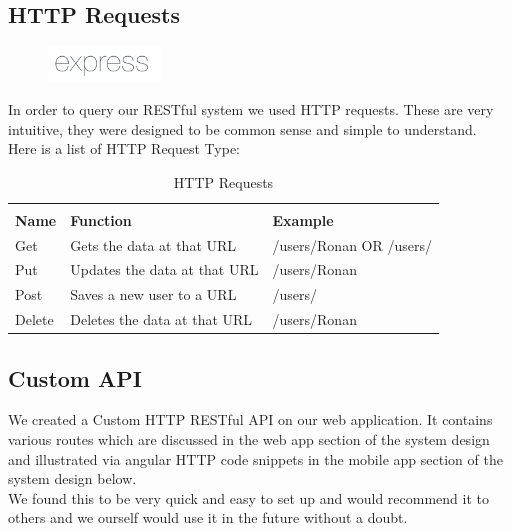   \subsection{HTTP Requests}
  \begin{figure}
  	\includegraphics[width=3cm]{img/mobile-app/logos/express.png}
  \end{figure} 
  \cite{http_methods}
  In order to query our RESTful system we used HTTP requests.
  These are very intuitive, they were designed to be common sense and simple to understand.
  \\
  Here is a list of HTTP Request Type:
	    \begin{table}[H]
	    	\centering
	    	\begin{tabular}{x{2cm}p{6cm}p{6cm}}
	    		\toprule \\
	    		\textbf{Name} & \textbf{Function} & \textbf{Example} \\ \hline
	    		Get & Gets the data at that URL & /users/Ronan OR /users/ \\ \hline
	    		Put & Updates the data at that URL & /users/Ronan \\ \hline
	    		Post & Saves a new user to a URL & /users/ \\ \hline
	    		Delete & Deletes the data at that URL & /users/Ronan \\ \hline    			    	    		
	    		\bottomrule
	    	\end{tabular}
	    	\caption{HTTP Requests}
	    	\label{table:HttpRequests}
	    \end{table}
    
  \subsection{Custom API}
We created a Custom HTTP RESTful API on our web application.
It contains various routes which are discussed in the web app section of the system design and illustrated via angular HTTP code snippets in the mobile app section of the system design below.
\\

We found this to be very quick and easy to set up and would recommend it to others and we ourself would use it in the future without a doubt.
\\

